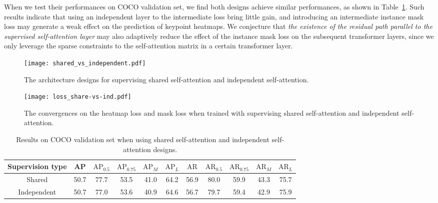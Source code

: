 \documentclass{article} \usepackage{iclr_conference,times}
\begin{document}
When we test their performances on COCO validation set, we find both designs achieve similar performances, as shown in Table~\ref{tab:model_design_choice}.
Such results indicate that using an independent layer to the intermediate loss bring little gain, and introducing an intermediate instance mask loss may generate a weak effect on the prediction of keypoint heatmaps. We conjecture that \textit{the existence of the residual path parallel to the supervised self-attention layer} may also adaptively reduce the effect of the instance mask loss on the subsequent transformer layers, since we only leverage the sparse constraints to the self-attention matrix in a certain transformer layer.

\begin{figure}[h]
	\centering
	\texttt{[image: shared\_vs\_independent.pdf]}
	\caption{The architecture designs for supervising shared self-attention and independent self-attention.}
	\label{fig:design_share-vs-ind}
\end{figure}

\begin{figure}[h]
	\centering
	\texttt{[image: loss\_share-vs-ind.pdf]}
	\caption{The convergences on the heatmap loss and mask loss when trained with supervising shared self-attention and independent self-attention.}
	\label{fig:share-vs-ind}
\end{figure}

\begin{table}[t]\small
	\centering
	\begin{tabular}{ccccccccccc}
		\toprule
		 Supervision type & AP & $\text{AP}_{0.5}$ & $\text{AP}_{0.75}$ & $\text{AP}_{M}$ & $\text{AP}_{L}$ & $\text{AR}$  &
		$\text{AR}_{0.5}$ & $\text{AR}_{0.75}$ &
		$\text{AR}_{M}$ & $\text{AR}_{L}$ \\
		\midrule
		Shared & 50.7	&77.7&	53.5 &41.0	&64.2&	56.9&	80.0	&59.9&	43.3&	75.7 \\
		Independent & 50.7 &	77.0 &	53.6 &	40.9 &	64.6 &	56.7 &	79.7 &	59.4 &	42.9 &	75.9\\
		\toprule
	\end{tabular}
	\caption{Results on COCO validation set when using shared self-attention and independent self-attention designs.}
	\label{tab:model_design_choice}
\end{table}



 
\end{document}
